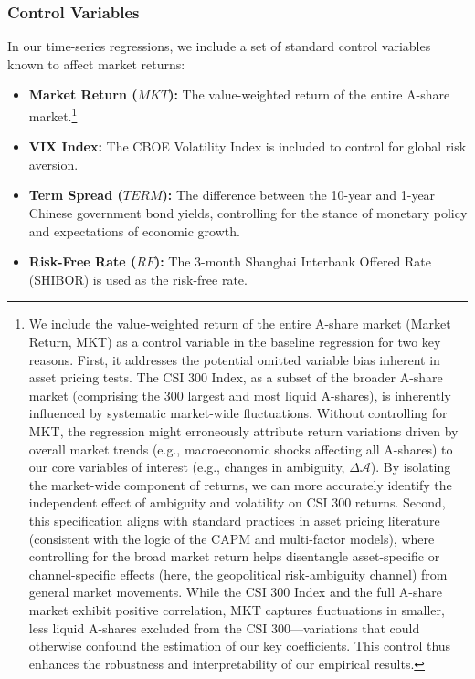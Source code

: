 \documentclass[preprint,12pt,authoryear]{elsarticle}
\begin{document}
\subsubsection{Control Variables}
In our time-series regressions, we include a set of standard control variables known to affect market returns:
\begin{itemize}
    \item \textbf{Market Return ($MKT$):} The value-weighted return of the entire A-share market.\footnote{We include the value-weighted return of the entire A-share market (Market Return, MKT) as a control variable in the baseline regression for two key reasons. First, it addresses the potential omitted variable bias inherent in asset pricing tests. The CSI 300 Index, as a subset of the broader A-share market (comprising the 300 largest and most liquid A-shares), is inherently influenced by systematic market-wide fluctuations. Without controlling for MKT, the regression might erroneously attribute return variations driven by overall market trends (e.g., macroeconomic shocks affecting all A-shares) to our core variables of interest (e.g., changes in ambiguity, $\Delta\mathcal{A}$). By isolating the market-wide component of returns, we can more accurately identify the independent effect of ambiguity and volatility on CSI 300 returns. Second, this specification aligns with standard practices in asset pricing literature (consistent with the logic of the CAPM and multi-factor models), where controlling for the broad market return helps disentangle asset-specific or channel-specific effects (here, the geopolitical risk-ambiguity channel) from general market movements. While the CSI 300 Index and the full A-share market exhibit positive correlation, MKT captures fluctuations in smaller, less liquid A-shares excluded from the CSI 300—variations that could otherwise confound the estimation of our key coefficients. This control thus enhances the robustness and interpretability of our empirical results.}
    \item \textbf{VIX Index:} The CBOE Volatility Index is included to control for global risk aversion.
    \item \textbf{Term Spread ($TERM$):} The difference between the 10-year and 1-year Chinese government bond yields, controlling for the stance of monetary policy and expectations of economic growth.
    \item \textbf{Risk-Free Rate ($RF$):} The 3-month Shanghai Interbank Offered Rate (SHIBOR) is used as the risk-free rate.
\end{itemize}
\end{document}
